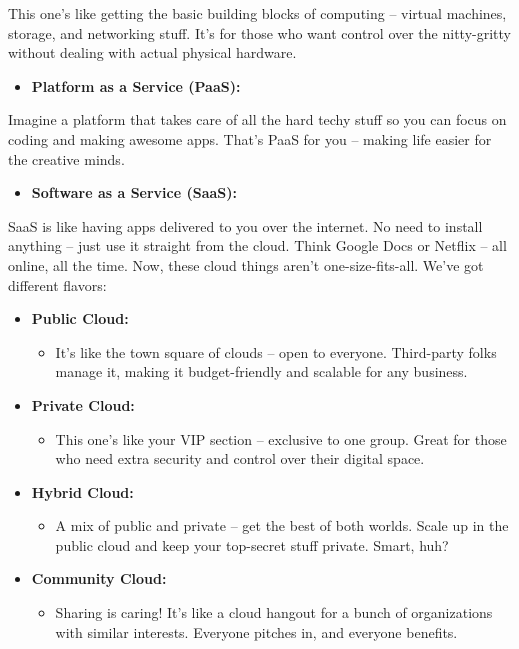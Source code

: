 \documentclass[
  letterpaper,
  DIV=11,
  numbers=noendperiod]{scrreprt}
\providecommand{\tightlist}{%
  \setlength{\itemsep}{0pt}\setlength{\parskip}{0pt}}\usepackage{longtable,booktabs,array}
\begin{document}
This one's like getting the basic building blocks of computing --
virtual machines, storage, and networking stuff. It's for those who want
control over the nitty-gritty without dealing with actual physical
hardware.

\begin{itemize}
\tightlist
\item
  \textbf{Platform as a Service (PaaS):}
\end{itemize}

Imagine a platform that takes care of all the hard techy stuff so you
can focus on coding and making awesome apps. That's PaaS for you --
making life easier for the creative minds.

\begin{itemize}
\tightlist
\item
  \textbf{Software as a Service (SaaS):}
\end{itemize}

SaaS is like having apps delivered to you over the internet. No need to
install anything -- just use it straight from the cloud. Think Google
Docs or Netflix -- all online, all the time. Now, these cloud things
aren't one-size-fits-all. We've got different flavors:

\begin{itemize}
\item
  \textbf{Public Cloud:}

  \begin{itemize}
  \tightlist
  \item
    It's like the town square of clouds -- open to everyone. Third-party
    folks manage it, making it budget-friendly and scalable for any
    business.
  \end{itemize}
\item
  \textbf{Private Cloud:}

  \begin{itemize}
  \tightlist
  \item
    This one's like your VIP section -- exclusive to one group. Great
    for those who need extra security and control over their digital
    space.
  \end{itemize}
\item
  \textbf{Hybrid Cloud:}

  \begin{itemize}
  \tightlist
  \item
    A mix of public and private -- get the best of both worlds. Scale up
    in the public cloud and keep your top-secret stuff private. Smart,
    huh?
  \end{itemize}
\item
  \textbf{Community Cloud:}

  \begin{itemize}
  \tightlist
  \item
    Sharing is caring! It's like a cloud hangout for a bunch of
    organizations with similar interests. Everyone pitches in, and
    everyone benefits.
  \end{itemize}
\end{itemize}
\end{document}
